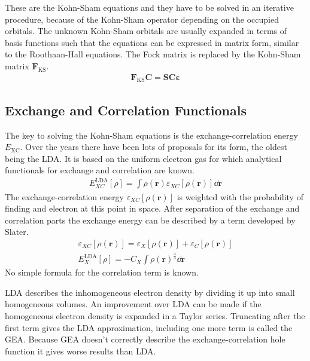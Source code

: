%
These are the Kohn-Sham equations and they have to be solved in an iterative
procedure, because of the Kohn-Sham operator depending on the occupied
orbitals.  The unknown Kohn-Sham orbitals are usually expanded in terms of
basis functions such that the equations can be expressed in matrix form,
similar to the Roothaan-Hall equations. The Fock matrix is replaced by the
Kohn-Sham matrix $\mathbf{F}_\text{KS}$.
%
\begin{align}
    \mathbf{F}_\text{KS}\mathbf{C} = \mathbf{SC\varepsilon}
\end{align}
%
\subsection{Exchange and Correlation Functionals}
\label{sec:exchangecorrelationfunctionals}

The key to solving the Kohn-Sham equations is the exchange-correlation energy
$E_\text{XC}$. Over the years there have been lots of proposals for its form,
the oldest being the \ac{LDA}. It is based on the uniform electron gas for
which analytical functionals for exchange and correlation are known.
%
\begin{align}
    E_{XC}^\text{LDA}\left[\rho\right]=\int\rho(\mathbf{r})\varepsilon_{XC}\left[\rho(\mathbf{r})\right]\dd\mathbf{r}
\end{align}
%
The exchange-correlation energy $\varepsilon_{XC}\left[\rho(\mathbf{r})\right]$
is weighted with the probability of finding and electron at this point in
space. After separation of the exchange and correlation parts the exchange
energy can be described by a term developed by Slater.
%
\begin{align}
	\varepsilon_{XC}\left[\rho(\mathbf{r})\right] = \varepsilon_{X}\left[\rho(\mathbf{r})\right] + \varepsilon_{C}\left[\rho(\mathbf{r})\right]\\
	E_{X}^\text{LDA}\left[\rho\right] = -C_X\int\rho(\mathbf{r})^{\frac{4}{3}}\dd\mathbf{r}
\end{align}
%
No simple formula for the correlation term is known.

\ac{LDA} describes the inhomogeneous electron density by dividing it up into
small homogeneous volumes. An improvement over \ac{LDA} can be made if the
homogeneous electron density is expanded in a Taylor series. Truncating after the
first term gives the \ac{LDA} approximation, including one more term is called
the \ac{GEA}. Because \ac{GEA} doesn't correctly describe the
exchange-correlation hole function it gives worse results than \ac{LDA}.

